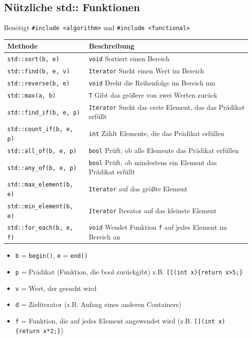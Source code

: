 \documentclass[10pt, a3paper, landscape]{article}
\begin{document}
\begin{multicols*}{4}
 \section{Nützliche std:: Funktionen}
 Benötigt \lstinline|#include <algorithm>| und \lstinline|#include <functional>|
 \newline 
 \newline 
 \noindent
 \begin{tabularx}{\linewidth}{l >{\RaggedRight}X}
 \toprule
 \textbf{Methode} & \textbf{Beschreibung} \\
 \midrule
 \lstinline|std::sort(b, e)| & \lstinline|void|  Sortiert einen Bereich \\
 \lstinline|std::find(b, e, v)| & \lstinline|Iterator|  Sucht einen Wert im Bereich \\
 \lstinline|std::reverse(b, e)| & \lstinline|void|  Dreht die Reihenfolge im Bereich um \\
 \lstinline|std::max(a, b)| & \lstinline|T|  Gibt das größere von zwei Werten zurück \\
 \lstinline|std::find_if(b, e, p)| & \lstinline|Iterator|  Sucht das erste Element, das das Prädikat erfüllt \\
 \lstinline|std::count_if(b, e, p)| & \lstinline|int|  Zählt Elemente, die das Prädikat erfüllen \\
 \lstinline|std::all_of(b, e, p)| & \lstinline|bool|  Prüft, ob alle Elemente das Prädikat erfüllen \\
 \lstinline|std::any_of(b, e, p)| & \lstinline|bool|  Prüft, ob mindestens ein Element das Prädikat erfüllt \\
 \lstinline|std::max_element(b, e)| & \lstinline|Iterator|  auf das größte Element\\
 \lstinline|std::min_element(b, e)| & \lstinline|Iterator|  Iterator auf das kleinste Element \\
 \lstinline|std::for_each(b, e, f)| & \lstinline|void|  Wendet Funktion \lstinline|f| auf jedes Element im Bereich an \\

 \bottomrule
 \end{tabularx}

 \begin{itemize}
     \item \lstinline|b| = \lstinline|begin()|, \lstinline|e| = \lstinline|end()|
     \item \lstinline|p| = Prädikat (Funktion, die bool zurückgibt) z.B. \lstinline|[](int x){return x>5;}|
     \item \lstinline|v| = Wert, der gesucht wird
     \item \lstinline|d| = Zieliterator (z.B. Anfang eines anderen Containers)
     \item \lstinline|f| = Funktion, die auf jedes Element angewendet wird (z.B. \lstinline|[](int x){return x*2;}|)
 \end{itemize}


\end{multicols*}
\end{document}
